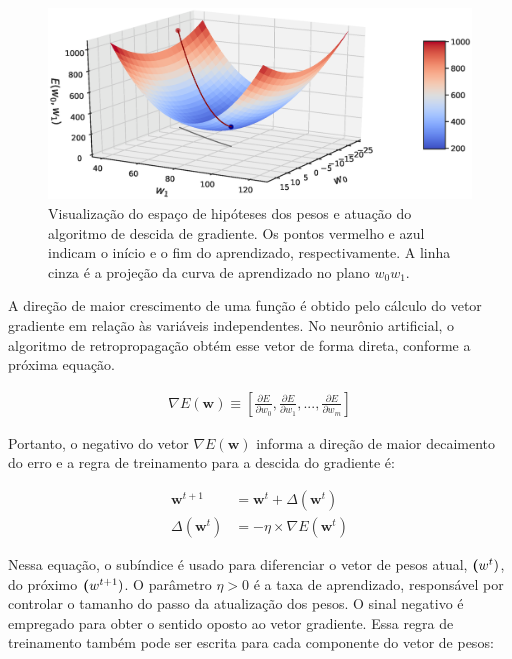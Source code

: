 \begin{figure}[h]
	\centering
	\includegraphics[width=1.1\textwidth]{figuras/gradient_descent.eps}
	\caption[Superfície de erro para o aprendizado dos pesos de um neurônio simples.]{Visualização do espaço de hipóteses dos pesos e atuação do algoritmo de descida de gradiente. Os pontos vermelho e azul indicam o início e o fim do aprendizado, respectivamente. A linha cinza é a projeção da curva de aprendizado no plano $w_0w_1$.}
	\label{fig:gradiente}
\end{figure}

A direção de maior crescimento de uma função é obtido pelo cálculo do vetor gradiente em relação às variáveis independentes. No neurônio artificial, o algoritmo de retropropagação obtém esse vetor de forma direta, conforme a próxima equação. 

\begin{equation}
\begin{aligned}
\nabla E(\textbf{w}) \equiv \left [ \frac{\partial E}{\partial w_{0}}, \frac{\partial E}{\partial w_{1}},...,\frac{\partial E}{\partial w_{m}} \right]
\end{aligned}
\end{equation}

Portanto, o negativo do vetor $\nabla E(\textbf{w})$ informa a direção de maior decaimento do erro e a regra de treinamento para a descida do gradiente é:

\begin{equation}
\begin{aligned}
\textbf{w}^{t+1}   &= \textbf{w}^{t} + \Delta(\textbf{w}^{t} ) \\
\Delta(\textbf{w}^{t}) &= - \eta \times \nabla E(\textbf{w}^{t})
\end{aligned}
\end{equation}

Nessa equação, o subíndice é usado para diferenciar o vetor de pesos atual, $\textbf({w}^{t})$, do próximo $\textbf({w}^{t+1})$. O parâmetro $\eta>0$ é a taxa de aprendizado, responsável por controlar o tamanho do passo da atualização dos pesos. O sinal negativo é empregado para obter o sentido oposto ao vetor gradiente. Essa regra de treinamento também pode ser escrita para cada componente do vetor de pesos:


